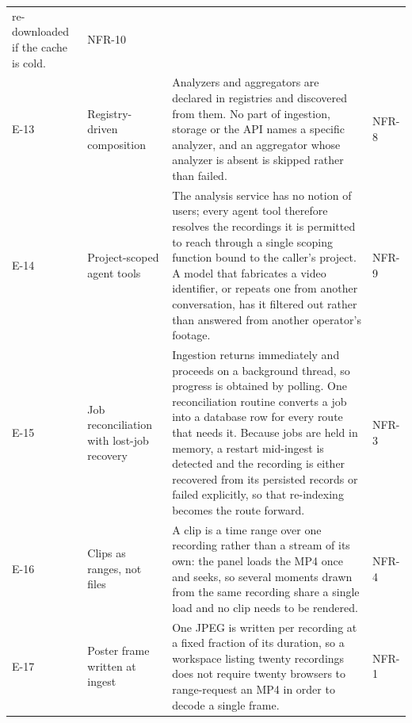 \begin{table}[htbp]
\begin{tabularx}{\textwidth}{@{}lL{3.5cm}XL{1.3cm}@{}}
re-downloaded if the cache is cold. & NFR-10 \\
E-13 & Registry-driven composition &
Analyzers and aggregators are declared in registries and discovered from them. No part
of ingestion, storage or the API names a specific analyzer, and an aggregator whose
analyzer is absent is skipped rather than failed. & NFR-8 \\
E-14 & Project-scoped agent tools &
The analysis service has no notion of users; every agent tool therefore resolves the
recordings it is permitted to reach through a single scoping function bound to the
caller's project. A model that fabricates a video identifier, or repeats one from
another conversation, has it filtered out rather than answered from another operator's
footage. & NFR-9 \\
E-15 & Job reconciliation with lost-job recovery &
Ingestion returns immediately and proceeds on a background thread, so progress is
obtained by polling. One reconciliation routine converts a job into a database row for
every route that needs it. Because jobs are held in memory, a restart mid-ingest is
detected and the recording is either recovered from its persisted records or failed
explicitly, so that re-indexing becomes the route forward. & NFR-3 \\
E-16 & Clips as ranges, not files &
A clip is a time range over one recording rather than a stream of its own: the panel
loads the MP4 once and seeks, so several moments drawn from the same recording share a
single load and no clip needs to be rendered. & NFR-4 \\
E-17 & Poster frame written at ingest &
One JPEG is written per recording at a fixed fraction of its duration, so a workspace
listing twenty recordings does not require twenty browsers to range-request an MP4 in
order to decode a single frame. & NFR-1 \\
\bottomrule
\end{tabularx}
\end{table}
